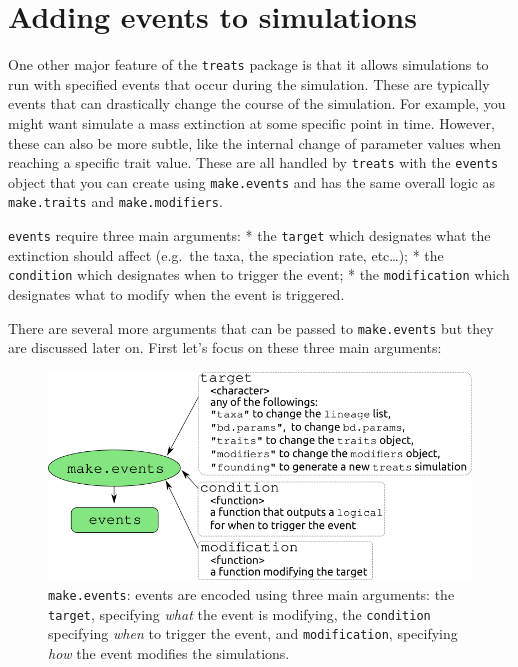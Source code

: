 \documentclass[
]{book}
\begin{document}
\hypertarget{makeevents}{%
\chapter{Adding events to simulations}\label{makeevents}}

One other major feature of the \texttt{treats} package is that it allows simulations to run with specified events that occur during the simulation.
These are typically events that can drastically change the course of the simulation.
For example, you might want simulate a mass extinction at some specific point in time.
However, these can also be more subtle, like the internal change of parameter values when reaching a specific trait value.
These are all handled by \texttt{treats} with the \texttt{events} object that you can create using \texttt{make.events} and has the same overall logic as \texttt{make.traits} and \texttt{make.modifiers}.

\texttt{events} require three main arguments:
* the \texttt{target} which designates what the extinction should affect (e.g.~the taxa, the speciation rate, etc\ldots);
* the \texttt{condition} which designates when to trigger the event;
* the \texttt{modification} which designates what to modify when the event is triggered.

There are several more arguments that can be passed to \texttt{make.events} but they are discussed later on.
First let's focus on these three main arguments:

\begin{figure}
\centering
\includegraphics{make.events.png}
\caption{\texttt{make.events}: events are encoded using three main arguments: the \texttt{target}, specifying \emph{what} the event is modifying, the \texttt{condition} specifying \emph{when} to trigger the event, and \texttt{modification}, specifying \emph{how} the event modifies the simulations.}
\end{figure}
\end{document}
